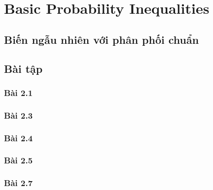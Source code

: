\chapter{Basic Probability Inequalities}

\section{Biến ngẫu nhiên với phân phối chuẩn}

\section{Bài tập}

\subsection{Bài 2.1}

\subsection{Bài 2.3}

\subsection{Bài 2.4}

\subsection{Bài 2.5}

\subsection{Bài 2.7}

